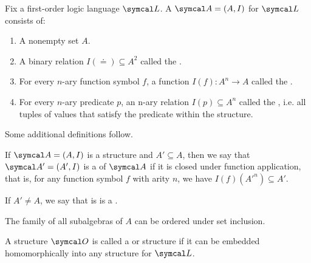 \begin{definition}\label{def:first_order_structure}\cite[definition 14.27]{OpenLogic20201202}
  Fix a first-order logic language \( \Cal{L} \). A  \( \Cal{A} = (A, I) \) for \( \Cal{L} \) consists of:
  \begin{enumerate}
    \item A nonempty set \( A \).
    \item A binary relation \( I(\doteq) \subseteq A^2 \) called the .
    \item For every \( n \)-ary function symbol \( f \), a function \( I(f): A^n \to A \) called the .
    \item For every \( n \)-ary predicate \( p \), an n-ary relation \( I(p) \subseteq A^n \) called the , i.e. all tuples of values that satisfy the predicate within the structure.
  \end{enumerate}

  Some additional definitions follow.

  \begin{itemize}
     If \( \Cal{A} = (A, I) \) is a structure and \( A' \subseteq A \), then we say that \( \Cal{A}' = (A', I) \) is a  of \( \Cal{A} \) if it is closed under function application, that is, for any function symbol \( f \) with arity \( n \), we have \( I(f)(A'^n) \subseteq A' \).

    If \( A' \neq A \), we say that is is a .

    The family of all subalgebras of \( A \) can be ordered under set inclusion.

     A structure \( \Cal{O} \) is called a  or  structure if it can be embedded homomorphically  into any structure for \( \Cal{L} \).
  \end{itemize}
\end{definition}

